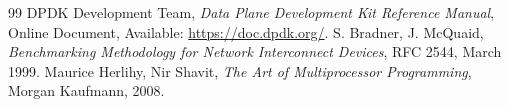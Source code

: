 \documentclass[12pt,a4paper,twoside]{report}
\begin{document}
\newpage
\begin{thebibliography}{99}
     DPDK Development Team, \textit{Data Plane Development Kit Reference Manual}, Online Document, Available: \url{https://doc.dpdk.org/}.
     S. Bradner, J. McQuaid, \textit{Benchmarking Methodology for Network Interconnect Devices}, RFC 2544, March 1999.
     Maurice Herlihy, Nir Shavit, \textit{The Art of Multiprocessor Programming}, Morgan Kaufmann, 2008.
\end{thebibliography}
\end{document}
